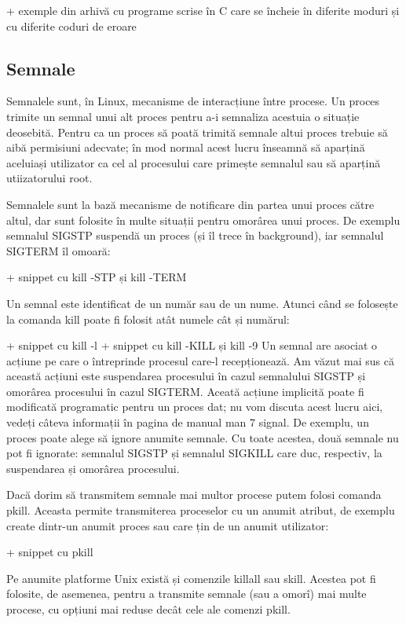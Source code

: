 +  exemple din arhivă cu programe scrise în C care se încheie în diferite moduri
și cu diferite coduri de eroare

\subsection{Semnale}
\label{sec:procese-operatii-semnale}

Semnalele sunt, în Linux, mecanisme de interacțiune între procese. Un proces
trimite un semnal unui alt proces pentru a-i semnaliza acestuia o situație
deosebită. Pentru ca un proces să poată trimită semnale altui proces trebuie să
aibă permisiuni adecvate; în mod normal acest lucru înseamnă să aparțină
aceluiași utilizator ca cel al procesului care primește semnalul sau să aparțină
utiizatorului root.

Semnalele sunt la bază mecanisme de notificare din partea unui proces către
altul, dar sunt folosite în multe situații pentru omorârea unui proces. De
exemplu semnalul SIGSTP suspendă un proces (și îl trece în background), iar
semnalul SIGTERM îl omoară:

+  snippet cu kill -STP și kill -TERM

Un semnal este identificat de un număr sau de un nume. Atunci când se folosește
la comanda kill poate fi folosit atât numele cât și numărul:

+  snippet cu kill -l
+  snippet cu kill -KILL și kill -9
%
Un semnal are asociat o acțiune pe care o întreprinde procesul care-l
recepționează. Am văzut mai sus că această acțiuni este suspendarea procesului
în cazul semnalului SIGSTP și omorârea procesului în cazul SIGTERM. Aceată
acțiune implicită poate fi modificată programatic pentru un proces dat; nu vom
discuta acest lucru aici, vedeți câteva informații în pagina de manual man 7
signal. De exemplu, un proces poate alege să ignore anumite semnale. Cu toate
acestea, două semnale nu pot fi ignorate: semnalul SIGSTP și semnalul SIGKILL
care duc, respectiv, la suspendarea și omorârea procesului.

Dacă dorim să transmitem semnale mai multor procese putem folosi comanda pkill.
Aceasta permite transmiterea proceselor cu un anumit atribut, de exemplu create
dintr-un anumit proces sau care țin de un anumit utilizator:

+     snippet cu pkill

Pe anumite platforme Unix există și comenzile killall sau skill. Acestea pot fi
folosite, de asemenea, pentru a transmite semnale (sau a omorî) mai multe
procese, cu opțiuni mai reduse decât cele ale comenzi pkill.

